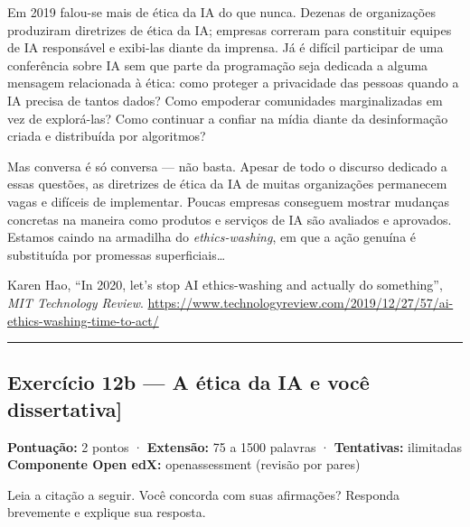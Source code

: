\documentclass[
  11pt,
]{article}
\renewcommand{\texttt}[1]{{\color{iaAmeixa}\small\ttfamily #1}}
\renewenvironment{quote}
  {\begin{tcolorbox}[
      breakable, enhanced jigsaw, rounded corners,
      arc=3pt, boxrule=0pt, frame hidden,
      colback=iaCaso,
      borderline west={3pt}{0pt}{iaRiscos},
      left=12pt, right=10pt, top=9pt, bottom=9pt,
      before skip=9pt, after skip=9pt]}
  {\end{tcolorbox}}
\begin{document}
\begin{quote}
Em 2019 falou-se mais de ética da IA do que nunca. Dezenas de
organizações produziram diretrizes de ética da IA; empresas correram
para constituir equipes de IA responsável e exibi-las diante da
imprensa. Já é difícil participar de uma conferência sobre IA sem que
parte da programação seja dedicada a alguma mensagem relacionada à
ética: como proteger a privacidade das pessoas quando a IA precisa de
tantos dados? Como empoderar comunidades marginalizadas em vez de
explorá-las? Como continuar a confiar na mídia diante da desinformação
criada e distribuída por algoritmos?

Mas conversa é só conversa --- não basta. Apesar de todo o discurso
dedicado a essas questões, as diretrizes de ética da IA de muitas
organizações permanecem vagas e difíceis de implementar. Poucas empresas
conseguem mostrar mudanças concretas na maneira como produtos e serviços
de IA são avaliados e aprovados. Estamos caindo na armadilha do
\emph{ethics-washing}, em que a ação genuína é substituída por promessas
superficiais\ldots{}

Karen Hao, ``In 2020, let's stop AI ethics-washing and actually do
something'', \emph{MIT Technology Review}.
\url{https://www.technologyreview.com/2019/12/27/57/ai-ethics-washing-time-to-act/}
\end{quote}

\begin{center}\rule{0.5\linewidth}{0.5pt}\end{center}

\hypertarget{exercuxedcio-12b-a-uxe9tica-da-ia-e-vocuxea-dissertativa}{%
\subsection{\texorpdfstring{Exercício 12b --- A ética da IA e você
\texttt{{[}dissertativa{]}}}{Exercício 12b --- A ética da IA e você {[}dissertativa{]}}}\label{exercuxedcio-12b-a-uxe9tica-da-ia-e-vocuxea-dissertativa}}

\textbf{Pontuação:} 2 pontos · \textbf{Extensão:} 75 a 1500 palavras ·
\textbf{Tentativas:} ilimitadas \textbf{Componente Open edX:}
\texttt{openassessment} (revisão por pares)

Leia a citação a seguir. Você concorda com suas afirmações? Responda
brevemente e explique sua resposta.
\end{document}
